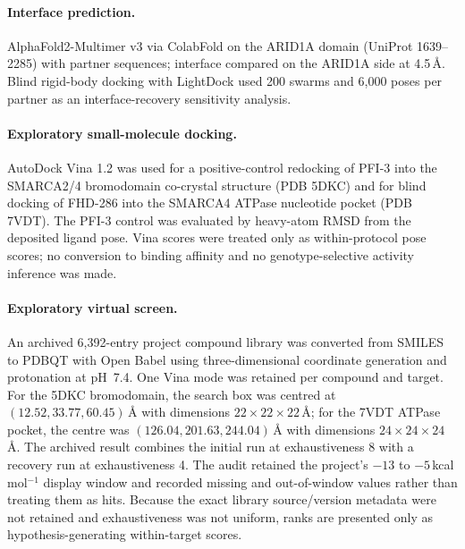 \documentclass[11pt,a4paper]{article}
\begin{document}
\paragraph{Interface prediction.} AlphaFold2-Multimer v3 via ColabFold
\citep{jumper2021,evans2024,mirdita2022} on the ARID1A domain (UniProt 1639--2285)
with partner sequences; interface compared on the ARID1A side at 4.5\,\AA{}.
Blind rigid-body docking with LightDock \citep{jimenez2018} used 200 swarms and
6{,}000 poses per partner as an interface-recovery sensitivity analysis.

\paragraph{Exploratory small-molecule docking.} AutoDock Vina 1.2
\citep{eberhardt2021} was used for a positive-control redocking of PFI-3 into the
SMARCA2/4 bromodomain co-crystal structure (PDB 5DKC) and for blind docking of
FHD-286 into the SMARCA4 ATPase nucleotide pocket (PDB 7VDT). The PFI-3 control
was evaluated by heavy-atom RMSD from the deposited ligand pose. Vina scores were
treated only as within-protocol pose scores; no conversion to binding affinity
and no genotype-selective activity inference was made.

\paragraph{Exploratory virtual screen.} An archived 6{,}392-entry project
compound library was converted from SMILES to PDBQT with Open Babel using
three-dimensional coordinate generation and protonation at pH~7.4. One Vina
mode was retained per compound and target. For the 5DKC bromodomain, the search
box was centred at $(12.52, 33.77, 60.45)$\,\AA{} with dimensions
$22\times22\times22$\,\AA{}; for the 7VDT ATPase pocket, the centre was
$(126.04, 201.63, 244.04)$\,\AA{} with dimensions
$24\times24\times24$\,\AA{}. The archived result combines the initial run at
exhaustiveness 8 with a recovery run at exhaustiveness 4. The audit retained the
project's $-13$ to $-5$\,kcal\,mol$^{-1}$ display window and recorded missing
and out-of-window values rather than treating them as hits. Because the exact
library source/version metadata were not retained and exhaustiveness was not
uniform, ranks are presented only as hypothesis-generating within-target scores.
\end{document}

